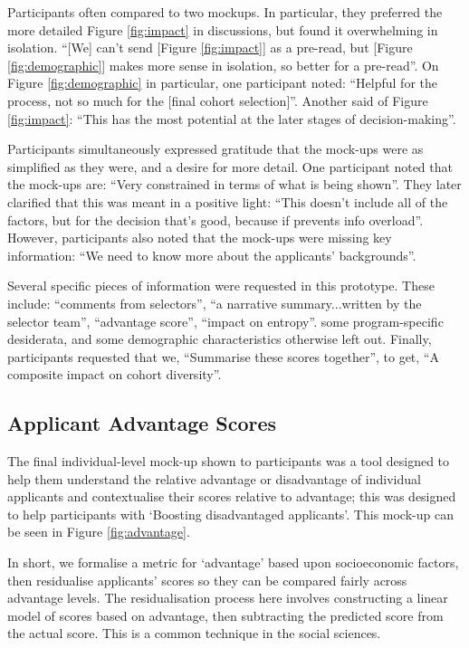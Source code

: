 Participants often compared to two mockups. In particular, they preferred the more detailed Figure \ref{fig:impact} in discussions, but found it overwhelming in isolation. ``[We] can't send [Figure \ref{fig:impact}] as a pre-read, but [Figure \ref{fig:demographic}] makes more sense in isolation, so better for a pre-read''. On Figure \ref{fig:demographic} in particular, one participant noted: ``Helpful for the process, not so much for the [final cohort selection]''. Another said of Figure \ref{fig:impact}: ``This has the most potential at the later stages of decision-making''.

Participants simultaneously expressed gratitude that the mock-ups were as simplified as they were, and a desire for more detail. One participant noted that the mock-ups are: ``Very constrained in terms of what is being shown''. They later clarified that this was meant in a positive light: ``This doesn't include all of the factors, but for the decision that's good, because if prevents info overload''. However, participants also noted that the mock-ups were missing key information: ``We need to know more about the applicants' backgrounds''.

Several specific pieces of information were requested in this prototype. These include: ``comments from selectors'', ``a narrative summary...written by the selector team'', ``advantage score'', ``impact on entropy''. some program-specific desiderata, and some demographic characteristics otherwise left out. Finally, participants requested that we, ``Summarise these scores together'', to get, ``A composite impact on cohort diversity''.

\subsection{Applicant Advantage Scores}
The final individual-level mock-up shown to participants was a tool designed to help them understand the relative advantage or disadvantage of individual applicants and contextualise their scores relative to advantage; this was designed to help participants with `Boosting disadvantaged applicants'. This mock-up can be seen in Figure \ref{fig:advantage}.

In short, we formalise a metric for `advantage' based upon socioeconomic factors, then residualise applicants' scores so they can be compared fairly across advantage levels. The residualisation process here involves constructing a linear model of scores based on advantage, then subtracting the predicted score from the actual score. This is a common technique in the social sciences.

